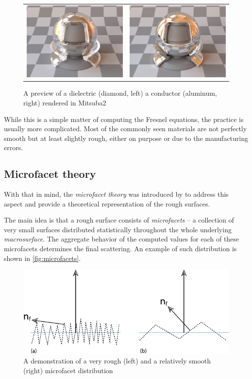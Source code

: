 \begin{figure}[h]
	\centering
	\begin{tabular}{cc}
		\includegraphics[width=.4\linewidth]{img/dielectric_diamond.jpg}
		&
		\includegraphics[width=.4\linewidth]{img/conductor_aluminium.jpg}
	\end{tabular}
	\caption{A preview of a dielectric (diamond, left) a  conductor (aluminum, right) rendered in Mitsuba2~\cite{mitsubaWeb}}
	\label{fig:compare_dielectric_conductor}
\end{figure}

While this is a simple matter of computing the Fresnel equations, the practice is usually more complicated. Most of the commonly seen materials are not perfectly smooth but at least slightly rough, either on purpose or due to the manufacturing errors.

\subsection{Microfacet theory}
With that in mind, the \emph{microfacet theory} was introduced by \citet{cook1982reflectance} to address this aspect and provide a theoretical representation of the rough surfaces.

The main idea is that a rough surface consists of \emph{microfacets} -- a collection of very small surfaces distributed statistically throughout the whole underlying \emph{macrosurface}. The aggregate behavior of the computed values for each of these microfacets determines the final scattering. An example of such distribution is shown in \autoref{fig:microfacets}.

\begin{figure}[h]
	\centering
	\includegraphics[width=.8\linewidth]{img/microfacets.pdf}
	\caption{A demonstration of a very rough (left) and a relatively smooth (right) microfacet distribution~\cite{pharr2016physically}}
	\label{fig:microfacets}
\end{figure}

